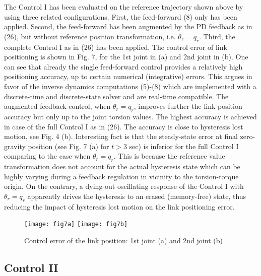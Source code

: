 \documentclass[a4paper, 10pt, conference]{ieeeconf}
\begin{document}
The Control I has been evaluated on the reference trajectory shown
above by using three related configurations. First, the
feed-forward (8) only has been applied. Second, the feed-forward
has been augmented by the PD feedback as in (26), but without
reference position transformation, i.e. $\theta_{ r} = q_{r}$.
Third, the complete Control I as in (26) has been applied. The
control error of link positioning is shown in Fig. 7, for the 1st
joint in (a) and 2nd joint in (b). One can see that already the
single feed-forward control provides a relatively high positioning
accuracy, up to certain numerical (integrative) errors. This
argues in favor of the inverse dynamics computations (5)-(8) which
are implemented with a discrete-time and discrete-state solver and
are real-time compatible. The augmented feedback control, when
$\theta_{r} = q_{r}$, improves further the link position accuracy
but only up to the joint torsion values. The highest accuracy is
achieved in case of the full Control I as in (26). The accuracy is
close to hysteresis lost motion, see Fig. 4 (b).
Interesting fact is that the steady-state error at final
zero-gravity position (see Fig. 7 (a) for $t > 3$ sec) is inferior
for the full Control I comparing to the case when $\theta _{r} =
q_{r}$. This is because the reference value transformation does
not account for the actual hysteresis state which can be highly
varying during a feedback regulation in vicinity to the
torsion-torque origin. On the contrary, a dying-out oscillating
response of the Control I with $\theta _{r} = q_{r}$ apparently
drives the hysteresis to an erased (memory-free) state, thus
reducing the impact of hysteresis lost motion on the link
positioning error.
\begin{figure}[!h]
\centering
\texttt{[image: fig7a]}
\texttt{[image: fig7b]}
\caption{Control error of the link position: 1st joint (a) and 2nd
joint (b)} \label{fig:control1error}
\end{figure}



\subsection*{Control II} \label{sec:6:2}
\end{document}

